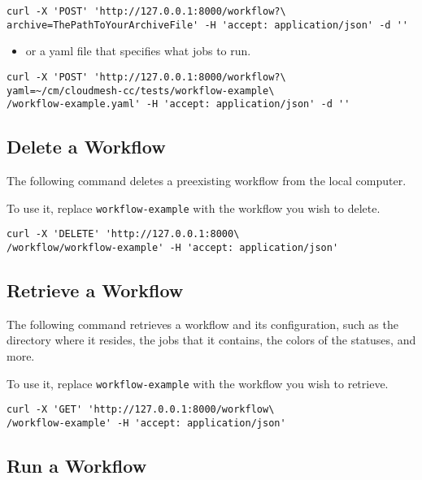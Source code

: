 \begin{verbatim}
curl -X 'POST' 'http://127.0.0.1:8000/workflow?\ 
archive=ThePathToYourArchiveFile' -H 'accept: application/json' -d ''
\end{verbatim}
\smallskip

\smallskip
\begin{itemize}
\item
  or a yaml file that specifies what jobs to run.
\end{itemize}

\begin{verbatim}
curl -X 'POST' 'http://127.0.0.1:8000/workflow?\
yaml=~/cm/cloudmesh-cc/tests/workflow-example\
/workflow-example.yaml' -H 'accept: application/json' -d ''
\end{verbatim}
\smallskip

\subsection{Delete a Workflow}\label{delete-a-workflow}

The following command deletes a preexisting workflow from the local
computer.

To use it, replace \texttt{workflow-example} with the workflow you wish
to delete.

\begin{verbatim}
curl -X 'DELETE' 'http://127.0.0.1:8000\
/workflow/workflow-example' -H 'accept: application/json'
\end{verbatim}

\subsection{Retrieve a Workflow}\label{retrieve-a-workflow}

The following command retrieves a workflow and its configuration, such
as the directory where it resides, the jobs that it contains, the colors
of the statuses, and more.

To use it, replace \texttt{workflow-example} with the workflow you wish
to retrieve.

\begin{verbatim}
curl -X 'GET' 'http://127.0.0.1:8000/workflow\
/workflow-example' -H 'accept: application/json'
\end{verbatim}

\subsection{Run a Workflow}\label{run-a-workflow}

